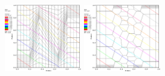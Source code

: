 \documentclass[compress,10pt]{beamer}
\begin{document}
\begin{frame}[t]
\includegraphics[width=0.25\textwidth]{images/z_quad_MV_k1.eps}
\includegraphics[width=0.25\textwidth]{images/z_poly_MV_k1.eps}
\end{frame}
\end{document}
